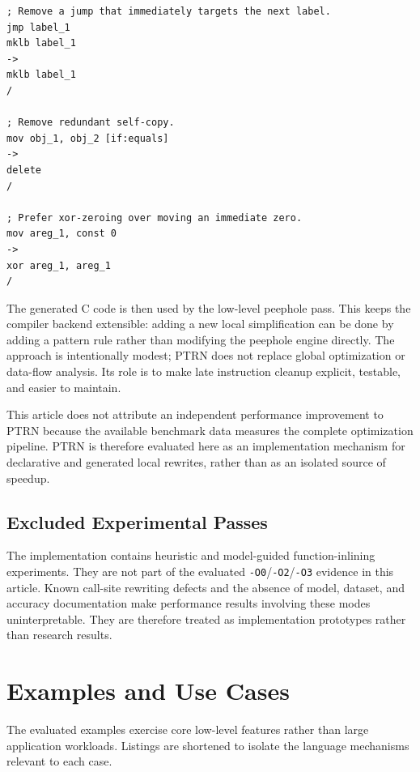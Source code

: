 \documentclass[10pt,twocolumn]{article}
\begin{document}
\begin{lstlisting}[language=PTRN,caption={Examples of PTRN peephole rules.}]
; Remove a jump that immediately targets the next label.
jmp label_1
mklb label_1
->
mklb label_1
/

; Remove redundant self-copy.
mov obj_1, obj_2 [if:equals]
->
delete
/

; Prefer xor-zeroing over moving an immediate zero.
mov areg_1, const 0
->
xor areg_1, areg_1
/
\end{lstlisting}

\par The generated C code is then used by the low-level peephole pass. This keeps the compiler backend extensible: adding a new local simplification can be done by adding a pattern rule rather than modifying the peephole engine directly. The approach is intentionally modest; PTRN does not replace global optimization or data-flow analysis. Its role is to make late instruction cleanup explicit, testable, and easier to maintain.
\par This article does not attribute an independent performance improvement to PTRN because the available benchmark data measures the complete optimization pipeline. PTRN is therefore evaluated here as an implementation mechanism for declarative and generated local rewrites, rather than as an isolated source of speedup.

\subsection{Excluded Experimental Passes}

\par The implementation contains heuristic and model-guided function-inlining experiments. They are not part of the evaluated \texttt{-O0}/\texttt{-O2}/\texttt{-O3} evidence in this article. Known call-site rewriting defects and the absence of model, dataset, and accuracy documentation make performance results involving these modes uninterpretable. They are therefore treated as implementation prototypes rather than research results.

\section{Examples and Use Cases}

\par The evaluated examples exercise core low-level features rather than large application workloads. Listings are shortened to isolate the language mechanisms relevant to each case.
\end{document}

